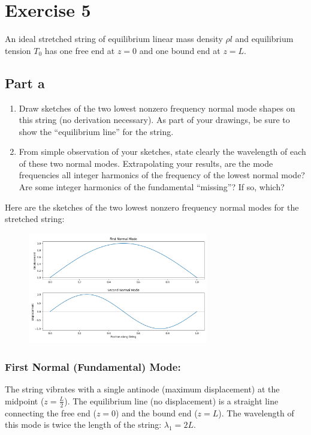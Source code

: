 \documentclass{article}
\newcommand{\pregunta}[1]{\begin{note}#1\end{note}}
\begin{document}
\clearpage
\section*{Exercise 5}

An ideal stretched string of equilibrium linear mass density \(\rho l\) and equilibrium tension \(T_0\) has one free end at \(z = 0\) and one bound end at \(z = L\).
\subsection*{Part a}
\pregunta{
\begin{enumerate}
    \item Draw sketches of the two lowest nonzero frequency normal mode shapes on this string (no derivation necessary). As part of your drawings, be sure to show the “equilibrium line” for the string.
    \item From simple observation of your sketches, state clearly the wavelength of each of these two normal modes. Extrapolating your results, are the mode frequencies all integer harmonics of the frequency of the lowest normal mode? Are some integer harmonics of the fundamental “missing”? If so, which?
\end{enumerate}}

\noindent Here are the sketches of the two lowest nonzero frequency normal modes for the stretched string:
\begin{figure}[h]
    \centering
    \includegraphics[width=0.7\textwidth]{Figure_1.png}
\end{figure}

\subsubsection*{First Normal (Fundamental) Mode:}
The string vibrates with a single antinode (maximum displacement) at the midpoint (\(z = \frac{L}{2}\)). The equilibrium line (no displacement) is a straight line connecting the free end (\(z = 0\)) and the bound end (\(z = L\)). The wavelength of this mode is twice the length of the string: \(\lambda_1 = 2L\).
\end{document}
